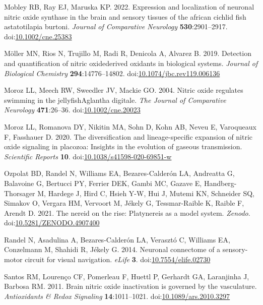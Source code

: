 \documentclass[
  11pt,
  letterpaper,
  DIV=11,
  numbers=noendperiod]{scrartcl}
\newlength{\cslhangindent}
\newenvironment{CSLReferences}[2] %
 {\begin{list}{}{%
  \setlength{\itemindent}{0pt}
  \setlength{\leftmargin}{0pt}
  \setlength{\parsep}{0pt}
  \ifodd #1
   \setlength{\leftmargin}{\cslhangindent}
   \setlength{\itemindent}{-1\cslhangindent}
  \fi
  \setlength{\itemsep}{#2\baselineskip}}}
 {\end{list}}
\begin{document}
\begin{CSLReferences}{1}{0}
Mobley RB, Ray EJ, Maruska KP. 2022. Expression and localization of
neuronal nitric oxide synthase in the brain and sensory tissues of the
african cichlid fish astatotilapia burtoni. \emph{Journal of Comparative
Neurology} \textbf{530}:2901--2917.
doi:\href{https://doi.org/10.1002/cne.25383}{10.1002/cne.25383}

Möller MN, Rios N, Trujillo M, Radi R, Denicola A, Alvarez B. 2019.
Detection and quantification of nitric oxide{\textendash}derived
oxidants in biological systems. \emph{Journal of Biological Chemistry}
\textbf{294}:14776--14802.
doi:\href{https://doi.org/10.1074/jbc.rev119.006136}{10.1074/jbc.rev119.006136}

Moroz LL, Meech RW, Sweedler JV, Mackie GO. 2004. Nitric oxide regulates
swimming in the jellyfishAglantha digitale. \emph{The Journal of
Comparative Neurology} \textbf{471}:26--36.
doi:\href{https://doi.org/10.1002/cne.20023}{10.1002/cne.20023}

Moroz LL, Romanova DY, Nikitin MA, Sohn D, Kohn AB, Neveu E, Varoqueaux
F, Fasshauer D. 2020. The diversification and lineage-specific expansion
of nitric oxide signaling in placozoa: Insights in the evolution of
gaseous transmission. \emph{Scientific Reports} \textbf{10}.
doi:\href{https://doi.org/10.1038/s41598-020-69851-w}{10.1038/s41598-020-69851-w}

Ozpolat BD, Randel N, Williams EA, Bezares-Calderón LA, Andreatta G,
Balavoine G, Bertucci PY, Ferrier DEK, Gambi MC, Gazave E,
Handberg-Thorsager M, Hardege J, Hird C, Hsieh Y-W, Hui J, Mutemi KN,
Schneider SQ, Simakov O, Vergara HM, Vervoort M, Jékely G,
Tessmar-Raible K, Raible F, Arendt D. 2021. The nereid on the rise:
Platynereis as a model system. \emph{Zenodo}.
doi:\href{https://doi.org/10.5281/ZENODO.4907400}{10.5281/ZENODO.4907400}

Randel N, Asadulina A, Bezares-Calderón LA, Verasztó C, Williams EA,
Conzelmann M, Shahidi R, Jékely G. 2014. Neuronal connectome of a
sensory-motor circuit for visual navigation. \emph{eLife} \textbf{3}.
doi:\href{https://doi.org/10.7554/elife.02730}{10.7554/elife.02730}

Santos RM, Lourenço CF, Pomerleau F, Huettl P, Gerhardt GA, Laranjinha
J, Barbosa RM. 2011. Brain nitric oxide inactivation is governed by the
vasculature. \emph{Antioxidants \& Redox Signaling}
\textbf{14}:1011--1021.
doi:\href{https://doi.org/10.1089/ars.2010.3297}{10.1089/ars.2010.3297}


\end{CSLReferences}
\end{document}
